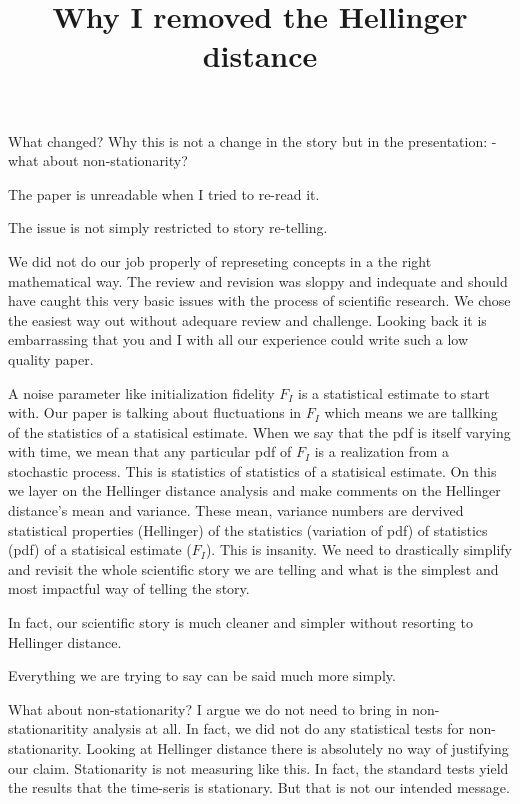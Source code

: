 \documentclass[conference]{IEEEtran}
\begin{document}
\title{Why I removed the Hellinger distance}

\maketitle

What changed?
Why this is not a change in the story but in the presentation:
- what about non-stationarity?

The paper is unreadable when I tried to re-read it.

The issue is not simply restricted to story re-telling. 

We did not do our job properly of represeting concepts in a the right mathematical way. The review and revision was sloppy and indequate and should have caught this very basic issues with the process of scientific research. We chose the easiest way out without adequare review and challenge. Looking back it is embarrassing that you and I with all our experience could write such a low quality paper.

A noise parameter like initialization fidelity $F_I$ is a statistical estimate to start with.
Our paper is talking about fluctuations in $F_I$ which means we are tallking of the statistics of a statisical estimate. When we say that the pdf is itself varying with time, we mean that any particular pdf of $F_I$ is a realization from a stochastic process. This is statistics of statistics of a statisical estimate. On this we layer on the Hellinger distance analysis and make comments on the Hellinger distance's mean and variance. These mean, variance numbers are dervived statistical properties (Hellinger) of the statistics (variation of pdf) of statistics (pdf) of a statisical estimate ($F_I$). This is insanity. We need to drastically simplify and revisit the whole scientific story we are telling and what is the simplest and most impactful way of telling the story.

In fact, our scientific story is much cleaner and simpler without resorting to Hellinger distance.

Everything we are trying to say can be said much more simply.

What about non-stationarity? I argue we do not need to bring in non-stationaritity analysis at all. In fact, we did not do any statistical tests for non-stationarity. Looking at Hellinger distance there is absolutely no way of justifying our claim. Stationarity is not measuring like this. In fact, the standard tests yield the results that the time-seris is stationary. But that is not our intended message. 
\end{document}
